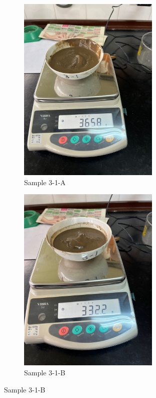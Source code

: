 \begin{figure}[H]
    \centering
    \begin{subfigure}[b]{0.48\textwidth}
        \includegraphics[width=\linewidth, height =9cm]{figures/appendix-f/3-1-A.jpg}
        \caption{Sample 3-1-A}
        \label{fig:second}
    \end{subfigure}
    \hfill
    \begin{subfigure}[b]{0.48\textwidth}
        \includegraphics[width=\linewidth, height =9cm]{figures/appendix-f/3-1-B.jpg}
        \caption{Sample 3-1-B}
        \label{fig:second}
    \end{subfigure}
    

    \vspace{0.5cm}


\end{figure}
